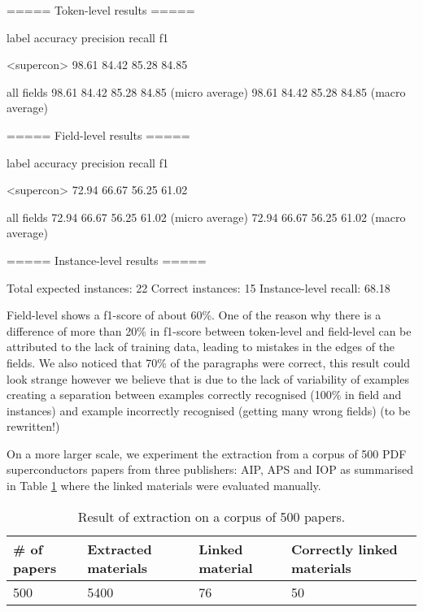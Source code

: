 \documentclass{article}
\begin{document}
\begin{verbnobox}[\small]
===== Token-level results =====

label                accuracy     precision    recall       f1     

<supercon>           98.61        84.42        85.28        84.85  

all fields           98.61        84.42        85.28        84.85   (micro average)
                     98.61        84.42        85.28        84.85   (macro average)

===== Field-level results =====

label                accuracy     precision    recall       f1     

<supercon>           72.94        66.67        56.25        61.02  

all fields           72.94        66.67        56.25        61.02   (micro average)
                     72.94        66.67        56.25        61.02   (macro average)

===== Instance-level results =====

Total expected instances:   22
Correct instances:          15
Instance-level recall:      68.18
\end{verbnobox}

Field-level shows a f1-score of about 60\%. One of the reason why there is a difference of more than 20\% in f1-score between token-level and field-level can be attributed to the lack of training data, leading to mistakes in the edges of the fields.
We also noticed that 70\% of the paragraphs were correct, this result could look strange however we believe that is due to the lack of variability of examples creating a separation between examples correctly recognised (100\% in field and instances) and example incorrectly recognised (getting many wrong fields) (to be rewritten!)

On a more larger scale, we experiment the extraction from a corpus of 500 PDF superconductors papers from three publishers: AIP, APS and IOP as summarised in Table \ref{table:result-extraction} where the linked materials were evaluated manually. 

\begin{table}[h!]
    \centering
    \begin{tabular}{ | m{6em} | m{6em} | m{6em} | m{6em} | } 
    \hline
        \# of papers & Extracted materials & Linked material & Correctly linked materials  \\
    \hline
        500 & 5400 & 76 & 50 \\ 
    \hline
    \end{tabular}
    \label{table:result-extraction}
    \caption{Result of extraction on a corpus of 500 papers.}    
\end{table}
\end{document}
